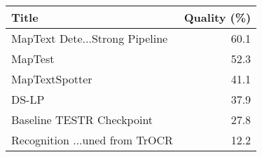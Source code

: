 \begin{tabular}{lr}
\toprule
Title & Quality (\%) \\
\midrule
MapText Dete...Strong Pipeline & 60.1 \\
MapTest & 52.3 \\
MapTextSpotter & 41.1 \\
DS-LP & 37.9 \\
Baseline TESTR Checkpoint & 27.8 \\
Recognition ...uned from TrOCR & 12.2 \\
\bottomrule
\end{tabular}
